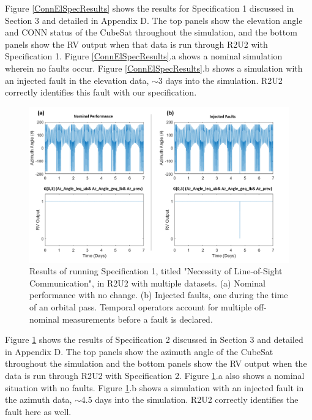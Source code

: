 \documentclass[conf]{new-aiaa}
\begin{document}
Figure \ref{ConnElSpecResults} shows the results for Specification 1 discussed in Section 3 and detailed in Appendix D. The top panels show the elevation angle and CONN status of the CubeSat throughout the simulation, and the bottom panels show the RV output when that data is run through R2U2 with Specification 1. Figure \ref{ConnElSpecResults}.a shows a nominal simulation wherein no faults occur. Figure \ref{ConnElSpecResults}.b shows a simulation with an injected fault in the elevation data, $\sim$3 days into the simulation. R2U2 correctly identifies this fault with our specification.

\begin{figure}[!ht]
\centering
\includegraphics[width=.8\textwidth]{Fig/Az_Spec2.png}
\caption{Results of running Specification 1, titled "Necessity of Line-of-Sight Communication", in R2U2 with multiple datasets. (a) Nominal performance with no change. (b) Injected faults, one during the time of an orbital pass. Temporal operators account for multiple off-nominal measurements before a fault is declared.}
\label{AzAngle}
\end{figure}

Figure \ref{AzAngle} shows the results of Specification 2 discussed in Section 3 and detailed in Appendix D. The top panels show the azimuth angle of the CubeSat throughout the simulation and the bottom panels show the RV output when the data is run through R2U2 with Specification 2. Figure \ref{AzAngle}.a also shows a nominal situation with no faults. Figure \ref{AzAngle}.b shows a simulation with an injected fault in the azimuth data, $\sim$4.5 days into the simulation. R2U2 correctly identifies the fault here as well.
\end{document}
